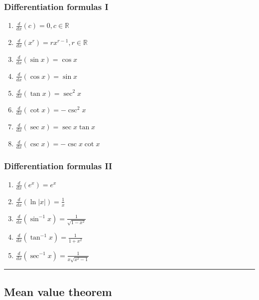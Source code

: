 \documentclass[
]{article}
\begin{document}
\hypertarget{differentiation-formulas-i}{%
\subsubsection{Differentiation formulas
I}\label{differentiation-formulas-i}}

\begin{enumerate}
\def\labelenumi{\arabic{enumi}.}
\item
  \(\displaystyle\frac{d}{dx}(c)=0, c \in \mathbb{R}\)
\item
  \(\displaystyle\frac{d}{dx}(x^r)=rx^{r-1}, r \in \mathbb{R}\)
\item
  \(\displaystyle\frac{d}{dx}(\sin x)=\cos x\)
\item
  \(\displaystyle\frac{d}{dx}(\cos x)=\sin x\)
\item
  \(\displaystyle\frac{d}{dx}(\tan x)=\sec^2x\)
\item
  \(\displaystyle\frac{d}{dx}(\cot x)=-\csc^2x\)
\item
  \(\displaystyle\frac{d}{dx}(\sec x) = \sec x\tan x\)
\item
  \(\displaystyle\frac{d}{dx}(\csc x)=-\csc x\cot x\)
\end{enumerate}

\hypertarget{differentiation-formulas-ii}{%
\subsubsection{Differentiation formulas
II}\label{differentiation-formulas-ii}}

\begin{enumerate}
\def\labelenumi{\arabic{enumi}.}
\item
  \(\displaystyle\frac{d}{dx}(e^x) = e^x\)
\item
  \(\displaystyle\frac{d}{dx}(\ln|x|) = \frac{1}{x}\)
\item
  \(\displaystyle\frac{d}{dx}(\sin^{-1}x) = \frac{1}{\sqrt{1-x^2}}\)
\item
  \(\displaystyle\frac{d}{dx}(\tan^{-1}x) = \frac{1}{1+x^2}\)
\item
  \(\displaystyle\frac{d}{dx}(\sec^{-1}x) = \frac{1}{x \sqrt{x^2-1}}\)
\end{enumerate}

\begin{center}\rule{0.5\linewidth}{0.5pt}\end{center}

\hypertarget{mean-value-theorem}{%
\subsection{Mean value theorem}\label{mean-value-theorem}}
\end{document}
